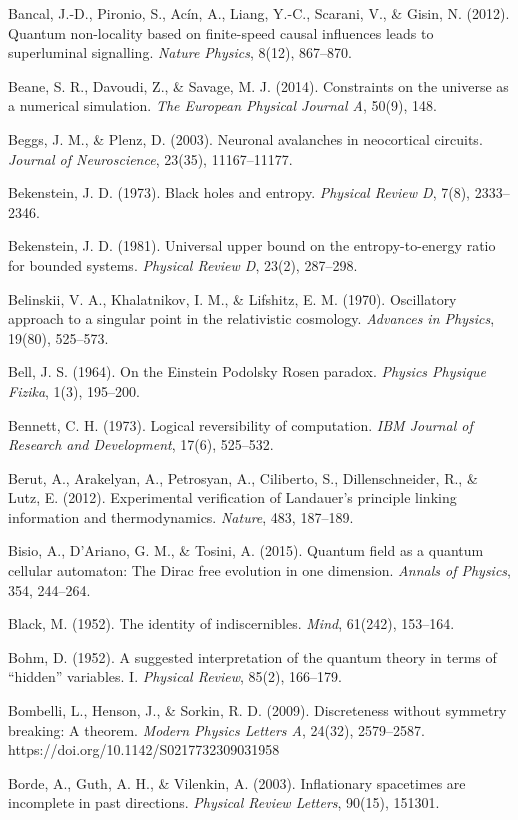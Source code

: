 \documentclass[
]{article}
\begin{document}
Bancal, J.-D., Pironio, S., Acín, A., Liang, Y.-C., Scarani, V., \&
Gisin, N. (2012). Quantum non-locality based on finite-speed causal
influences leads to superluminal signalling. \emph{Nature Physics},
8(12), 867--870.

Beane, S. R., Davoudi, Z., \& Savage, M. J. (2014). Constraints on the
universe as a numerical simulation. \emph{The European Physical Journal
A}, 50(9), 148.

Beggs, J. M., \& Plenz, D. (2003). Neuronal avalanches in neocortical
circuits. \emph{Journal of Neuroscience}, 23(35), 11167--11177.

Bekenstein, J. D. (1973). Black holes and entropy. \emph{Physical Review
D}, 7(8), 2333--2346.

Bekenstein, J. D. (1981). Universal upper bound on the entropy-to-energy
ratio for bounded systems. \emph{Physical Review D}, 23(2), 287--298.

Belinskii, V. A., Khalatnikov, I. M., \& Lifshitz, E. M. (1970).
Oscillatory approach to a singular point in the relativistic cosmology.
\emph{Advances in Physics}, 19(80), 525--573.

Bell, J. S. (1964). On the Einstein Podolsky Rosen paradox.
\emph{Physics Physique Fizika}, 1(3), 195--200.

Bennett, C. H. (1973). Logical reversibility of computation. \emph{IBM
Journal of Research and Development}, 17(6), 525--532.

Berut, A., Arakelyan, A., Petrosyan, A., Ciliberto, S., Dillenschneider,
R., \& Lutz, E. (2012). Experimental verification of Landauer's
principle linking information and thermodynamics. \emph{Nature}, 483,
187--189.

Bisio, A., D'Ariano, G. M., \& Tosini, A. (2015). Quantum field as a
quantum cellular automaton: The Dirac free evolution in one dimension.
\emph{Annals of Physics}, 354, 244--264.

Black, M. (1952). The identity of indiscernibles. \emph{Mind}, 61(242),
153--164.

Bohm, D. (1952). A suggested interpretation of the quantum theory in
terms of ``hidden'' variables. I. \emph{Physical Review}, 85(2),
166--179.

Bombelli, L., Henson, J., \& Sorkin, R. D. (2009). Discreteness without
symmetry breaking: A theorem. \emph{Modern Physics Letters A}, 24(32),
2579--2587. https://doi.org/10.1142/S0217732309031958

Borde, A., Guth, A. H., \& Vilenkin, A. (2003). Inflationary spacetimes
are incomplete in past directions. \emph{Physical Review Letters},
90(15), 151301.
\end{document}
